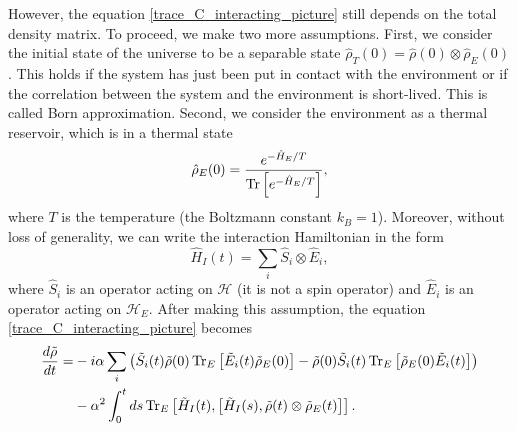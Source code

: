 However, the equation \eqref{trace_C_interacting_picture} still depends on the total density matrix. To proceed, we make two more assumptions. First, we consider the initial state of the universe to be a separable state $\hat\rho_T(0)=\hat\rho(0)\otimes \hat\rho_E(0)$. This holds if the system has just been put in contact with the environment or if the correlation between the system and the environment is short-lived. This is called Born approximation. 
Second, we consider the environment as a thermal reservoir, which is in a thermal state 
\begin{equation}
    \hat\rho_E(0) = \frac{e^{-\hat H_E/T}}{\operatorname{Tr}\left[e^{-\hat H_E/T}\right]},
\end{equation}
where $T$ is the temperature (the Boltzmann constant $k_B = 1$).
Moreover, without loss of generality, we can write the interaction Hamiltonian in the form
\begin{equation}\label{interacting_Hamiltonian}
    \hat H_I(t) = \sum_i \hat S_i\otimes \hat E_i,
\end{equation}
where $\hat S_i$ is an operator acting on $\mathcal{H}$ (it is not a spin operator) and $\hat E_i$ is an operator acting on $\mathcal{H}_E$. After making this assumption, the equation \eqref{trace_C_interacting_picture} becomes
\begin{equation}
    \begin{split}
        \frac{d\tilde\rho}{dt} =&-i\alpha\sum_i\left(\tilde S_i(t)\tilde \rho(0)\operatorname{Tr}_E\left[\tilde E_i(t)\tilde\rho_E(0)\right] - \tilde \rho(0)\tilde S_i(t)\operatorname{Tr}_E\left[\tilde\rho_E(0)\tilde E_i(t)\right]\right) \\ 
        &-\alpha^2 \int_{0}^{t}ds \operatorname{Tr}_E\left[\tilde H_I(t),\left[\tilde H_I(s),\tilde\rho(t)\otimes\tilde\rho_E(t)\right]\right].
    \end{split}
\end{equation}


